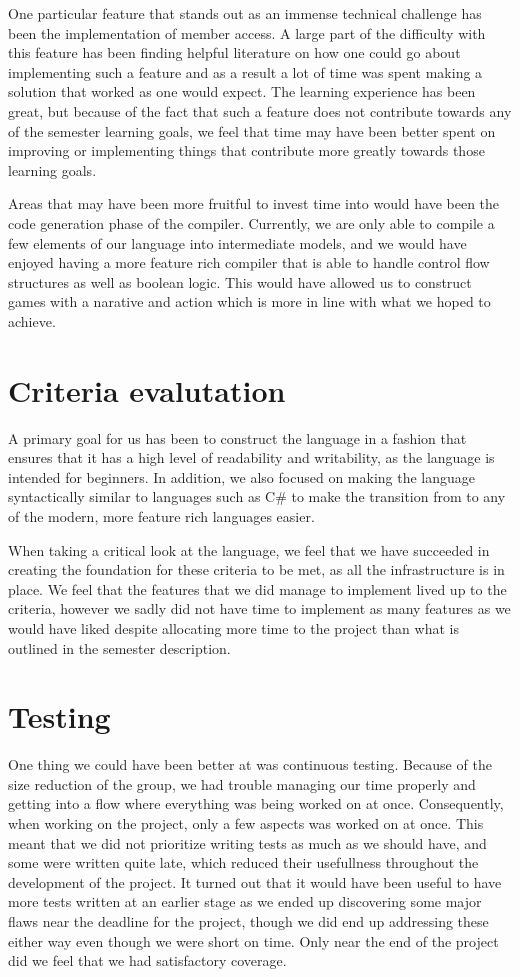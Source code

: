One particular feature that stands out as an immense technical challenge has been the implementation of member access. A large part of the difficulty with this feature has been finding helpful literature on how one could go about implementing such a feature and as a result a lot of time was spent making a solution that worked as one would expect. The learning experience has been great, but because of the fact that such a feature does not contribute towards any of the semester learning goals, we feel that time may have been better spent on improving or implementing things that contribute more greatly towards those learning goals. 

Areas that may have been more fruitful to invest time into would have been the code generation phase of the compiler. Currently, we are only able to compile a few elements of our language into intermediate models, and we would have enjoyed having a more feature rich compiler that is able to handle control flow structures as well as boolean logic. This would have allowed us to construct games with a narative and action which is more in line with what we hoped to achieve.

\section{Criteria evalutation}
A primary goal for us has been to construct the language in a fashion that ensures that it has a high level of readability and writability, as the language is intended for beginners. In addition, we also focused on making the language syntactically similar to languages such as C\# to make the transition from \dazel{} to any of the modern, more feature rich languages easier. 

When taking a critical look at the language, we feel that we have succeeded in creating the foundation for these criteria to be met, as all the infrastructure is in place. 
We feel that the features that we did manage to implement lived up to the criteria, however we sadly did not have time to implement as many features as we would have liked despite allocating more time to the project than what is outlined in the semester description.

\section{Testing}
One thing we could have been better at was continuous testing. 
Because of the size reduction of the group, we had trouble managing our time properly and getting into a flow where everything was being worked on at once.
Consequently, when working on the project, only a few aspects was worked on at once.
This meant that we did not prioritize writing tests as much as we should have, and some were written quite late, which reduced their usefullness throughout the development of the project. 
It turned out that it would have been useful to have more tests written at an earlier stage as we ended up discovering some major flaws near the deadline for the project, though we did end up addressing these either way even though we were short on time. 
Only near the end of the project did we feel that we had satisfactory coverage.

